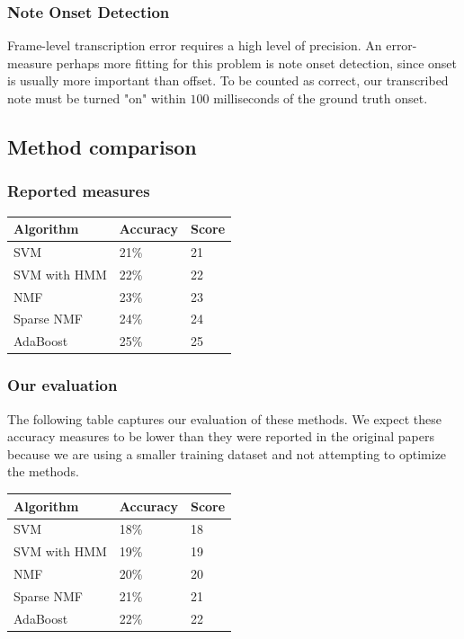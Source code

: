 \documentclass[5p]{elsarticle}
\begin{document}
\subsubsection{Note Onset Detection}
Frame-level transcription error requires a high level of precision.  An error-measure perhaps more fitting for this problem is note onset detection, since onset is usually more important than offset.  To be counted as correct, our transcribed note must be turned "on" within $100$ milliseconds of the ground truth onset.
\subsection{Method comparison}

\subsubsection{Reported measures}
\begin{center}
\begin{tabular}{|l|l|l|}
\hline
Algorithm & Accuracy & Score \\ \hline
SVM & 21\% & 21 \\ \hline
SVM with HMM & 22\% & 22 \\ \hline
NMF & 23\% & 23 \\ \hline
Sparse NMF & 24\% & 24 \\ \hline
AdaBoost & 25\% & 25 \\ \hline
\end{tabular}
\end{center}

\subsubsection{Our evaluation}

The following table captures our evaluation of these methods. We expect these accuracy measures to be lower than they were reported in the original papers because we are using a smaller training dataset and not attempting to optimize the methods.

\begin{center}
\begin{tabular}{|l|l|l|}
\hline
Algorithm & Accuracy & Score \\ \hline
SVM & 18\% & 18 \\ \hline
SVM with HMM & 19\% & 19 \\ \hline
NMF & 20\% & 20 \\ \hline
Sparse NMF & 21\% & 21 \\ \hline
AdaBoost & 22\% & 22 \\ \hline
\end{tabular}
\end{center}
\end{document}
